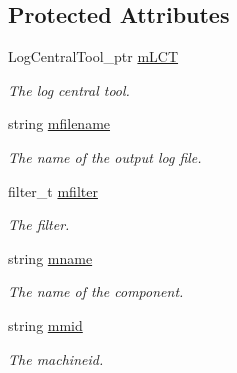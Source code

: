 \subsection*{Protected Attributes}
\begin{DoxyCompactItemize}
\item 
\hypertarget{classLogTool_a81bb512caab3501ddb34bb57f8f253f5}{
LogCentralTool\_\-ptr \hyperlink{classLogTool_a81bb512caab3501ddb34bb57f8f253f5}{mLCT}}
\label{classLogTool_a81bb512caab3501ddb34bb57f8f253f5}

\begin{DoxyCompactList}\small\item\em The log central tool. \item\end{DoxyCompactList}\item 
\hypertarget{classLogTool_a480ca49f6c8f255016b4ab0e44cf33b0}{
string \hyperlink{classLogTool_a480ca49f6c8f255016b4ab0e44cf33b0}{mfilename}}
\label{classLogTool_a480ca49f6c8f255016b4ab0e44cf33b0}

\begin{DoxyCompactList}\small\item\em The name of the output log file. \item\end{DoxyCompactList}\item 
\hypertarget{classLogTool_a9aa2005cafd5077314a4bfe0f59941c3}{
filter\_\-t \hyperlink{classLogTool_a9aa2005cafd5077314a4bfe0f59941c3}{mfilter}}
\label{classLogTool_a9aa2005cafd5077314a4bfe0f59941c3}

\begin{DoxyCompactList}\small\item\em The filter. \item\end{DoxyCompactList}\item 
\hypertarget{classLogTool_ad673ded17ddb971d25a037a1b16eece9}{
string \hyperlink{classLogTool_ad673ded17ddb971d25a037a1b16eece9}{mname}}
\label{classLogTool_ad673ded17ddb971d25a037a1b16eece9}

\begin{DoxyCompactList}\small\item\em The name of the component. \item\end{DoxyCompactList}\item 
\hypertarget{classLogTool_a15cb77d00b5b901fdced22a1384f846a}{
string \hyperlink{classLogTool_a15cb77d00b5b901fdced22a1384f846a}{mmid}}
\label{classLogTool_a15cb77d00b5b901fdced22a1384f846a}

\begin{DoxyCompactList}\small\item\em The machineid. \item\end{DoxyCompactList}\end{DoxyCompactItemize}


